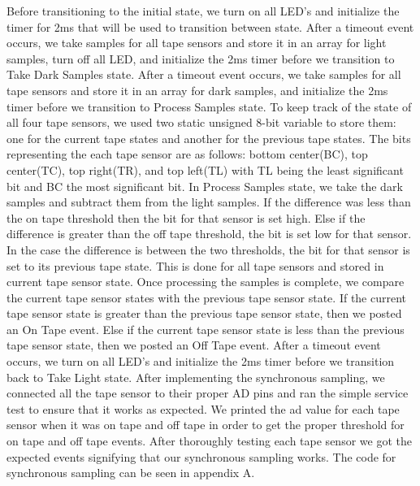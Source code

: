 \documentclass{article}
\begin{document}
Before transitioning to the initial state, we turn on all LED's and initialize the timer for 2ms that will be used to transition between state.  After a timeout event occurs, we take samples for all tape sensors and store it in an array for light samples, turn off all LED, and initialize the 2ms timer before we transition to Take Dark Samples state.  After a timeout event occurs, we take samples for all tape sensors and store it in an array for dark samples, and initialize the 2ms timer before we transition to Process Samples state.  To keep track of the state of all four tape sensors, we used two static unsigned 8-bit variable to store them: one for the current tape states and another for the previous tape states.  The bits representing the each tape sensor are as follows: bottom center(BC), top center(TC), top right(TR), and top left(TL) with TL being the least significant bit and BC the most significant bit.  In Process Samples state, we take the dark samples and subtract them from the light samples.  If the difference was less than the on tape threshold then the bit for that sensor is set high.  Else if the difference is greater than the off tape threshold, the bit is set low for that sensor.  In the case the difference is between the two thresholds, the bit for that sensor is set to its previous tape state.  This is done for all tape sensors and stored in current tape sensor state.  Once processing the samples is complete, we compare the current tape sensor states with the previous tape sensor state.  If the current tape sensor state is greater than the previous tape sensor state, then we posted an On Tape event.  Else if the current tape sensor state is less than the previous tape sensor state, then we posted an Off Tape event.  After a timeout event occurs, we turn on all LED's and initialize the 2ms timer before we transition back to Take Light state.  After implementing the synchronous sampling, we connected all the tape sensor to their proper AD pins and ran the simple service test to ensure that it works as expected.  We printed the ad value for each tape sensor when it was on tape and off tape in order to get the proper threshold for on tape and off tape events.  After thoroughly testing each tape sensor we got the expected events signifying that our synchronous sampling works. The code for synchronous sampling can be seen in appendix A.  
\end{document}
